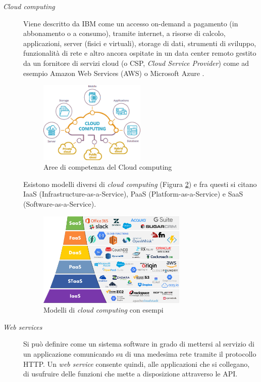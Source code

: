 \begin{description}
    \item [\textit{Cloud computing}] Viene descritto da IBM \cite{ibm_cloudcomputing} come un accesso on-demand a pagamento (in abbonamento o a consumo), tramite internet, a risorse di calcolo, applicazioni, server (fisici e virtuali), storage di dati, strumenti di sviluppo, funzionalità di rete e altro ancora ospitate in un data center remoto gestito da un fornitore di servizi cloud (o CSP, \textit{Cloud Service Provider}) come ad esempio Amazon Web Services (AWS) o Microsoft Azure \cite{azure}.
    \begin{figure} 
        \centering
        \includegraphics[width=0.5\textwidth]{img/cloud-computing-services.png}
        \caption{Aree di competenza del Cloud computing \cite{cloudcomputing}}
        \label{fig:cloudcomputing}
    \end{figure}
    Esistono modelli diversi di \textit{cloud computing} (Figura \ref{fig:cloudcomp-models}) e fra questi si citano IaaS (Infrastructure-as-a-Service), PaaS (Platform-as-a-Service) e SaaS (Software-as-a-Service).

    \begin{figure} 
        \centering
        \includegraphics[width=0.7\textwidth]{img/cloud-computing-models.png}
        \caption{Modelli di \textit{cloud computing} con esempi \cite{cloudcomputingModels}}
        \label{fig:cloudcomp-models}
    \end{figure}

    \item [\textit{Web services}] Si può definire come un sistema software in grado di mettersi al servizio di un applicazione comunicando su di una medesima rete tramite il protocollo HTTP. Un \textit{web service} consente quindi, alle applicazioni che si collegano, di usufruire delle funzioni che mette a disposizione attraverso le API.
\end{description}

